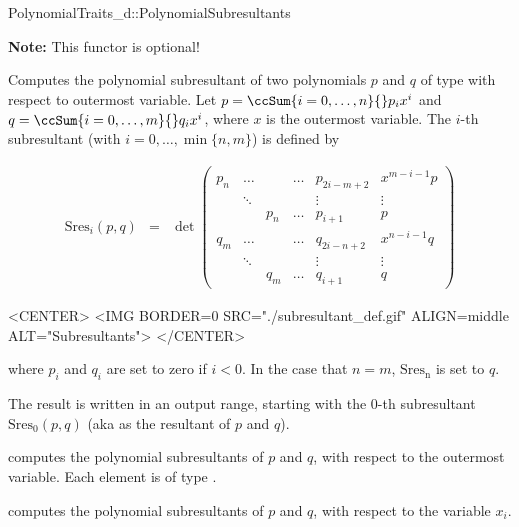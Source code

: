 \begin{ccRefConcept}{PolynomialTraits_d::PolynomialSubresultants}

\textbf{Note:} This functor is optional!

\ccDefinition

Computes the polynomial subresultant of two polynomials $p$ and $q$ of 
type  with respect to outermost variable.
Let 
$p=\ccSum{i=0,\ldots,n}{} p_i x^i$ and 
$q=\ccSum{i=0,\ldots,m}{} q_i x^i$, where $x$
is the outermost variable.
The $i$-th subresultant (with $i=0,\ldots,\min\{n,m\}$) is defined by

\begin{ccTexOnly}
\begin{eqnarray*}
\mathrm{Sres}_i(p,q)&=&\det \left(\begin{array}{ccccccc}
p_n & \ldots &&\ldots& p_{2i-m+2}&x^{m-i-1}p \\
&\ddots&&&\vdots&\vdots\\
&&p_n&\ldots&p_{i+1}&p\\
q_m & \ldots &&\ldots & q_{2i-n+2}&x^{n-i-1}q \\
&\ddots&&&\vdots&\vdots\\
&&q_m&\ldots&q_{i+1}&q
\end{array}\right)
\end{eqnarray*}
\end{ccTexOnly}

\begin{ccHtmlOnly}
<CENTER>
<IMG BORDER=0 SRC="./subresultant_def.gif" ALIGN=middle ALT="Subresultants">
</CENTER>
\end{ccHtmlOnly}

where $p_i$ and $q_i$ are set to zero if $i<0$.
In the case that $n=m$, $\mathrm{Sres_n}$ is set to $q$.

The result is written in an output range, starting with the $0$-th subresultant
$\mathrm{Sres}_0(p,q)$
(aka as the resultant of $p$ and $q$).


\ccOperations
{}
         { computes the polynomial subresultants of $p$ and $q$, 
           with respect to the outermost variable. Each element is of type
           .}

         { computes the polynomial subresultants of $p$ and $q$, 
           with respect to the variable $x_i$.}


\end{ccRefConcept}
